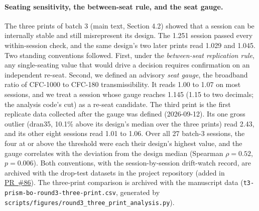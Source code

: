 \documentclass[11pt]{article}
\newcommand{\repo}{https://github.com/vertical-cloud-lab/tensegrity-optimization}
\begin{document}
\paragraph{Seating sensitivity, the between-seat rule, and the seat
gauge.} The three prints of batch 3 (main text, Section 4.2) showed
that a session can be internally stable and still misrepresent its
design. The 1.251 session passed every within-session check, and the
same design's two later prints read 1.029 and 1.045. Two standing
conventions followed. First, under the \emph{between-seat replication
rule}, any single-seating value that would drive a decision requires
confirmation on an independent re-seat. Second, we defined an advisory
\emph{seat gauge}, the broadband ratio of CFC-1000 to CFC-180
transmissibility. It reads 1.00 to 1.07 on most sessions, and we
treat a session whose gauge reaches 1.145 (1.15 to two decimals; the
analysis code's cut) as a re-seat candidate. The
third print is the first replicate data collected after the gauge was
defined (\mbox{2026-09-12}). Its one gross outlier (dran35, 10.1\% above its design's
median over the three prints) read 2.43, and its other eight sessions
read 1.01 to 1.06. Over all 27 batch-3 sessions, the four at or above
the threshold were each their design's highest value, and the gauge
correlates with the deviation from the design median (Spearman
$\rho = 0.52$, $p = 0.006$). Both conventions, with the
session-by-session drift-watch record, are archived with the drop-test datasets
in the project repository (added in \href{\repo/pull/86}{PR~\#86}). The three-print comparison is
archived with the manuscript data
(\texttt{t3-prism-bo-round3-three-print.csv}, generated by
\texttt{scripts/\allowbreak figures/\allowbreak round3\_three\_print\_analysis.py}).
\end{document}

